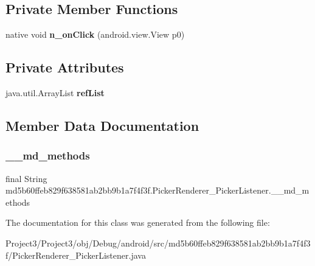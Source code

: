 \subsection*{Private Member Functions}
\begin{DoxyCompactItemize}
\item 
\mbox{\label{classmd5b60ffeb829f638581ab2bb9b1a7f4f3f_1_1PickerRenderer__PickerListener_a3c25433046ef21b522e4ecdfcec61d76}} 
native void {\bfseries n\+\_\+on\+Click} (android.\+view.\+View p0)
\end{DoxyCompactItemize}
\subsection*{Private Attributes}
\begin{DoxyCompactItemize}
\item 
\mbox{\label{classmd5b60ffeb829f638581ab2bb9b1a7f4f3f_1_1PickerRenderer__PickerListener_a5a5c7704983e4c275b2f8194214c4e9c}} 
java.\+util.\+Array\+List {\bfseries ref\+List}
\end{DoxyCompactItemize}


\subsection{Member Data Documentation}
\mbox{\label{classmd5b60ffeb829f638581ab2bb9b1a7f4f3f_1_1PickerRenderer__PickerListener_a69ae8fbc93864ac38ac6d4c96542e2b5}} 
\subsubsection{\texorpdfstring{\+\_\+\+\_\+md\+\_\+methods}{\_\_md\_methods}}
{\footnotesize\ttfamily final String md5b60ffeb829f638581ab2bb9b1a7f4f3f.\+Picker\+Renderer\+\_\+\+Picker\+Listener.\+\_\+\+\_\+md\+\_\+methods\hspace{0.3cm}{\ttfamily [static]}}



The documentation for this class was generated from the following file\+:\begin{DoxyCompactItemize}
\item 
Project3/\+Project3/obj/\+Debug/android/src/md5b60ffeb829f638581ab2bb9b1a7f4f3f/Picker\+Renderer\+\_\+\+Picker\+Listener.\+java\end{DoxyCompactItemize}
